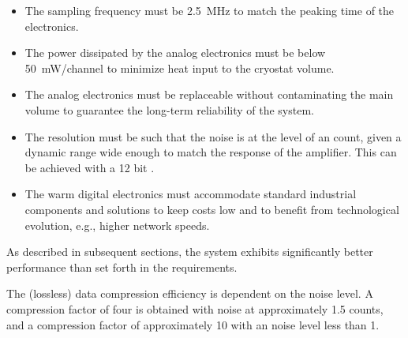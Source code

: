 \begin{itemize}
\item{The sampling frequency must be \SI{2.5}{\MHz} to match the peaking time of the  electronics.}

\item{The power dissipated by the  analog electronics must be below \SI{50}{\milli\watt/channel} to minimize heat input to the cryostat volume.}

\item{The  analog electronics must be replaceable without contaminating the main \lar volume to guarantee the long-term reliability of the system.}

\item{The  resolution must be such that the noise is at the level of an  count, given a dynamic range wide enough to match the response of the  amplifier. This can be achieved with a \num{12} bit .} 

\item{%
The warm digital electronics must accommodate standard industrial components and solutions to keep costs low and to benefit from technological evolution, e.g., higher network speeds.}
\end{itemize}
As described in subsequent sections, %
the system exhibits significantly better performance than set forth in the requirements.

The (lossless) data compression efficiency is dependent on the noise level. A compression factor of four is obtained with noise at approximately \SI{1.5}{} counts, and  
 a compression factor of approximately \num{10} 
with an \rms noise level less than \SI{1}{}. 


